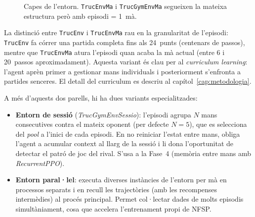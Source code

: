 \begin{figure}[H]
  \centering
  \caption[Capes de l'entorn.]{Capes de l'entorn. \texttt{TrucEnvMa} i \texttt{TrucGymEnvMa} segueixen
           la mateixa estructura però amb episodi = 1~mà.}
  \label{fig:capes-entorn}
\end{figure}

La distinció entre \texttt{TrucEnv} i \texttt{TrucEnvMa} rau en la granularitat de
l'episodi: \texttt{TrucEnv} fa córrer una partida completa fins als 24~punts (centenars
de passos), mentre que \texttt{TrucEnvMa} atura l'episodi quan acaba la mà actual
(entre 6 i 20~passos aproximadament). Aquesta variant és clau per al
\emph{curriculum learning}: l'agent aprèn primer a gestionar mans individuals i
posteriorment s'enfronta a partides senceres. El detall del curriculum es descriu
al capítol~\ref{cap:metodologia}.

A més d'aquests dos parells, hi ha dues variants especialitzades:

\begin{itemize}
  \item \textbf{Entorn de sessió} (\emph{TrucGymEnvSessio}): l'episodi agrupa $N$
        mans consecutives contra el mateix oponent (per defecte $N=5$), que es
        selecciona del \emph{pool} a l'inici de cada episodi. En no reiniciar l'estat
        entre mans, obliga l'agent a acumular context al llarg de la sessió i li dona
        l'oportunitat de detectar el patró de joc del rival. S'usa a la Fase~4
        (memòria entre mans amb \emph{RecurrentPPO}).

  \item \textbf{Entorn paral·lel}: executa diverses instàncies de l'entorn per mà en
        processos separats i en recull les trajectòries (amb les recompenses
        intermèdies) al procés principal. Permet col·lectar dades de molts episodis
        simultàniament, cosa que accelera l'entrenament propi de \ac{NFSP}.
\end{itemize}

